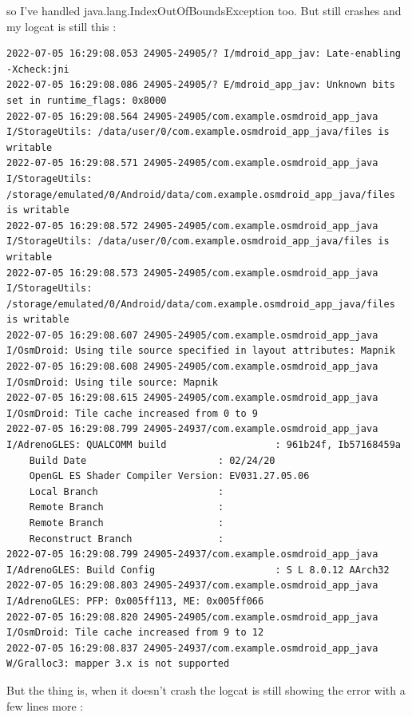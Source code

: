 \documentclass[a4paper,12pt]{book}
\begin{document}
so I've handled java.lang.IndexOutOfBoundsException too. But still crashes and my logcat is still this :

\begin{lstlisting}
2022-07-05 16:29:08.053 24905-24905/? I/mdroid_app_jav: Late-enabling -Xcheck:jni
2022-07-05 16:29:08.086 24905-24905/? E/mdroid_app_jav: Unknown bits set in runtime_flags: 0x8000
2022-07-05 16:29:08.564 24905-24905/com.example.osmdroid_app_java I/StorageUtils: /data/user/0/com.example.osmdroid_app_java/files is writable
2022-07-05 16:29:08.571 24905-24905/com.example.osmdroid_app_java I/StorageUtils: /storage/emulated/0/Android/data/com.example.osmdroid_app_java/files is writable
2022-07-05 16:29:08.572 24905-24905/com.example.osmdroid_app_java I/StorageUtils: /data/user/0/com.example.osmdroid_app_java/files is writable
2022-07-05 16:29:08.573 24905-24905/com.example.osmdroid_app_java I/StorageUtils: /storage/emulated/0/Android/data/com.example.osmdroid_app_java/files is writable
2022-07-05 16:29:08.607 24905-24905/com.example.osmdroid_app_java I/OsmDroid: Using tile source specified in layout attributes: Mapnik
2022-07-05 16:29:08.608 24905-24905/com.example.osmdroid_app_java I/OsmDroid: Using tile source: Mapnik
2022-07-05 16:29:08.615 24905-24905/com.example.osmdroid_app_java I/OsmDroid: Tile cache increased from 0 to 9
2022-07-05 16:29:08.799 24905-24937/com.example.osmdroid_app_java I/AdrenoGLES: QUALCOMM build                   : 961b24f, Ib57168459a
    Build Date                       : 02/24/20
    OpenGL ES Shader Compiler Version: EV031.27.05.06
    Local Branch                     : 
    Remote Branch                    : 
    Remote Branch                    : 
    Reconstruct Branch               : 
2022-07-05 16:29:08.799 24905-24937/com.example.osmdroid_app_java I/AdrenoGLES: Build Config                     : S L 8.0.12 AArch32
2022-07-05 16:29:08.803 24905-24937/com.example.osmdroid_app_java I/AdrenoGLES: PFP: 0x005ff113, ME: 0x005ff066
2022-07-05 16:29:08.820 24905-24905/com.example.osmdroid_app_java I/OsmDroid: Tile cache increased from 9 to 12
2022-07-05 16:29:08.837 24905-24937/com.example.osmdroid_app_java W/Gralloc3: mapper 3.x is not supported
\end{lstlisting}

But the thing is, when it doesn't crash the logcat is still showing the error with a few lines more :
\end{document}
